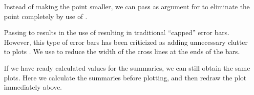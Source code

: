 \documentclass[krantz2]{krantz}\usepackage{knitr}%
\begin{document}
Instead of making the point smaller, we can pass  as argument for  to eliminate the point completely by use of .

\begin{knitrout}\footnotesize
{}\color{fgcolor}\begin{kframe}
\begin{alltt}
  \hlstd{(} \hlstd{=} \hlstd{,}
                \hlstd{=} \hlstd{,}  \hlstd{=} \hlstd{,}
                \hlstd{=} \hlstd{)}
\end{alltt}
\end{kframe}
\end{knitrout}

Passing  to  results in the use of  resulting in traditional ``capped'' error bars. However, this type of error bars has been criticized as adding unnecessary clutter to plots \autocite{Tufte1983}. We use  to reduce the width of the cross lines at the ends of the bars.

\begin{knitrout}\footnotesize
{}\color{fgcolor}\begin{kframe}
\begin{alltt}
  \hlstd{(} \hlstd{=} \hlstd{,}
                \hlstd{=} \hlstd{,}  \hlstd{=} \hlstd{,}  \hlstd{=} \hlstd{,}
                \hlstd{=} \hlstd{)}
\end{alltt}
\end{kframe}
\end{knitrout}

If we have ready calculated values for the summaries, we can still obtain the same plots. Here we calculate the summaries before plotting, and then redraw the plot immediately above.\label{exmpl:plot:errorbar:precalc}
\end{document}
